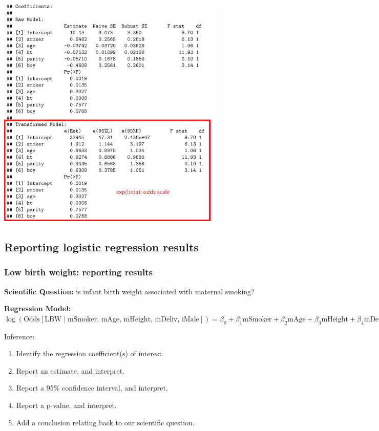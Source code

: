 \documentclass[12pt, 
hyperref={colorlinks=true, linkcolor=blue, urlcolor=cyan}]{beamer}
\begin{document}
\begin{frame}[noframenumbering]
\vspace{0.1cm}
\includegraphics[width=0.82\textwidth]{./figs/pregnancy_coef_exp}
\end{frame}

\subsection{Reporting logistic regression results}
\begin{frame}
\frametitle{Low birth weight: reporting results}
\textbf{Scientific Question:} is infant birth weight associated with maternal smoking? 

\textbf{Regression Model:}
$\log \left(\text{Odds}[ \text{LBW} \mid \text{mSmoker, mAge, mHeight, mDeliv, iMale}]\right) = \beta_0 + \beta_1 \text{mSmoker} + \beta_2 \text{mAge} + \beta_3 \text{mHeight} + \beta_4 \text{mDeliv} + \beta_5 \text{iMale}$

\color{blue} Inference: \color{black}
\begin{enumerate}
\item Identify the regression coefficient(s) of interest.
\item Report an estimate, and interpret.
\item Report a 95\% confidence interval, and interpret.
\item Report a p-value, and interpret. 
\item Add a conclusion relating back to our scientific question.
\end{enumerate}

\end{frame}
\end{document}
